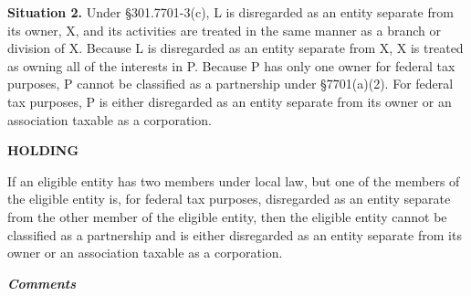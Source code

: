 \begin{select}
\textbf{Situation 2.} Under \S301.7701-3(c), L is disregarded as an entity separate from its owner, X, and its 
activities are treated in the same manner as a branch or division of X. Because L is disregarded as 
an entity separate from X, X is treated as owning all of the interests in P. Because P has only one 
owner for federal tax purposes, P cannot be classified as a partnership under \S7701(a)(2). For 
federal tax purposes, P is either disregarded as an entity separate from its owner or an association 
taxable as a corporation.
\begin{center} \textbf{HOLDING}
\end{center}
If an eligible entity has two members under local law, but one of the members of the eligible entity 
is, for federal tax purposes, disregarded as an entity separate from the other member of the 
eligible entity, then the eligible entity cannot be classified as a partnership and is either disregarded 
as an entity separate from its owner or an association taxable as a corporation. 
\end{select}

	\begin{center}
		\textbf{\emph{Comments}}
			\end{center}


